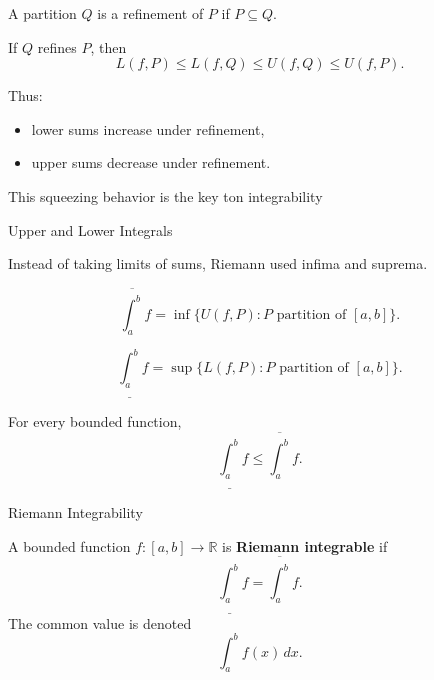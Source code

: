 \documentclass[12pt, a4paper]{article}
\begin{document}
\begin{definition}[Refinement]
A partition $Q$ is a refinement of $P$ if $P\subseteq Q$.
\end{definition}

\clearpage

\begin{theorem}
If $Q$ refines $P$, then
\[
L(f,P)\le L(f,Q)\le U(f,Q)\le U(f,P).
\]
\end{theorem}

Thus:
\begin{itemize}
\item lower sums increase under refinement,
\item upper sums decrease under refinement.
\end{itemize}

This squeezing behavior is the key ton integrability

\clearpage

\begin{heading}
Upper and Lower Integrals
\end{heading}

Instead of taking limits of sums, Riemann used infima and suprema.

\begin{definition}
\[
\overline{\int_a^b} f
=\inf\{U(f,P):P\text{ partition of }[a,b]\}.
\]
\end{definition}

\clearpage

\begin{definition}
\[
\underline{\int_a^b} f
=\sup\{L(f,P):P\text{ partition of }[a,b]\}.
\]
\end{definition}

\clearpage

\begin{theorem}
For every bounded function,
\[
\underline{\int_a^b} f\le \overline{\int_a^b} f.
\]
\end{theorem}

\clearpage

\begin{heading}
Riemann Integrability
\end{heading}

\begin{definition}
A bounded function $f:[a,b]\to\mathbb{R}$ is \textbf{Riemann integrable} if
\[
\underline{\int_a^b} f=\overline{\int_a^b} f.
\]
The common value is denoted
\[
\int_a^b f(x)\,dx.
\]
\end{definition}
\end{document}
